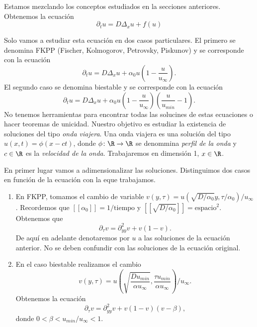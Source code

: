 \documentclass{article}
\begin{document}
Estamos mezclando los conceptos estudiados en la secciones anteriores. Obtenemos la ecuación
\begin{equation}
  \label{eq:rea-dif}
  \partial_t u = D \Delta_x u + f(u)
\end{equation}

Solo vamos a estudiar esta ecuación en dos casos particulares. El primero se denomina FKPP (Fischer,
Kolmogorov, Petrovsky, Piskunov) y se corresponde con la ecuación
\begin{equation}
  \label{eq:rea-dif:1}
  \partial_t u = D \Delta_x u + \alpha_0 u \left(1- \frac{u}{ u_{\infty}}\right).
\end{equation}
El segundo caso se denomina biestable y se corresponde con la ecuación
\begin{equation}
  \label{eq:rea-dif:2}
  \partial_t u = D \Delta_x u + \alpha_0 u \left(1- \frac{u}{ u_{\infty}}\right)\left(\frac{u}{ u_{min}}-1\right).
\end{equation}
No tenemos herramientas para encontrar todas las solucines de estas ecuaciones o hacer teoremas de
unicidad. Nuestro objetivo es estudiar la existencia de soluciones del tipo \emph{onda viajera}. Una
onda viajera es una solución del tipo $u(x,t) = \phi(x-ct)$, donde $\phi \colon \R \to \R$ se
denommina \emph{perfil de la onda} y $c \in \R$ es la \emph{velocidad de la onda}. Trabajaremos en
dimensión 1, $x \in \R$.

En primer lugar vamos a adimensionalizar las soluciones. Distinguimos dos casos en función de la
ecuación con la eque trabajamos.
\begin{enumerate}
\item En FKPP, tomamos el cambio de variable
  $v(y, \tau) = u(\sqrt{D / \alpha_0} y, \tau / \alpha_0) / u_{\infty}$. Recordemos que
  $[[ \alpha_0 ]] = 1 / \text{tiempo}$ y $[[ \sqrt{D / \alpha_0} ]] = \text{espacio}^2$. Obtenemos que
  \begin{equation}
    \label{eq:rea-dif:1:ad}
    \partial_{\tau} v = \partial^2_{yy} v + v(1-v).
  \end{equation}
  De aquí en adelante denotaremos por $u$ a las soluciones de la ecuación anterior. No se deben
  confundir con las soluciones de la ecuación original.
\item En el caso biestable realizamos el cambio
  \[ v(y, \tau) = u \left( \sqrt{\frac{D u_{min}}{\alpha u_{\infty}}}, \frac{\tau u_{min}}{\alpha
        u_{\infty}} \right) / u_{\infty}. \] Obtenemos la ecuación
  \begin{equation}
    \label{eq:rea-dif:2:ad}
    \partial_{\tau} v = \partial_{yy}^2 v + v(1-v)(v-\beta),
  \end{equation}
  donde $0 < \beta < u_{min}/u_{\infty} < 1$.
\end{enumerate}
\end{document}
